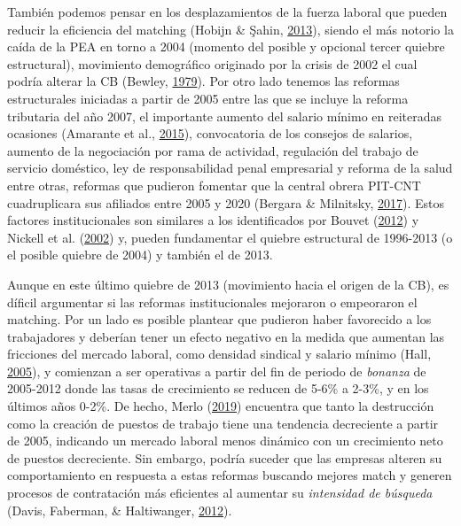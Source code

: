 \documentclass[12pt,oneside]{reedthesis}
\begin{document}
También podemos pensar en los desplazamientos de la fuerza laboral que pueden reducir la eficiencia del matching (Hobijn \& Şahin, \protect\hyperlink{ref-Hobijn2013}{2013}), siendo el más notorio la caída de la PEA en torno a 2004 (momento del posible y opcional tercer quiebre estructural), movimiento demográfico originado por la crisis de 2002 el cual podría alterar la CB (Bewley, \protect\hyperlink{ref-Bewley1979}{1979}). Por otro lado tenemos las reformas estructurales iniciadas a partir de 2005 entre las que se incluye la reforma tributaria del año 2007, el importante aumento del salario mínimo en reiteradas ocasiones (Amarante et al., \protect\hyperlink{ref-Amarante2015}{2015}), convocatoria de los consejos de salarios, aumento de la negociación por rama de actividad, regulación del trabajo de servicio doméstico, ley de responsabilidad penal empresarial y reforma de la salud entre otras, reformas que pudieron fomentar que la central obrera PIT-CNT cuadruplicara sus afiliados entre 2005 y 2020 (Bergara \& Milnitsky, \protect\hyperlink{ref-Bergara2017}{2017}). Estos factores institucionales son similares a los identificados por Bouvet (\protect\hyperlink{ref-Bouvet2012}{2012}) y Nickell et al. (\protect\hyperlink{ref-Nickell2002}{2002}) y, pueden fundamentar el quiebre estructural de 1996-2013 (o el posible quiebre de 2004) y también el de 2013.

Aunque en este último quiebre de 2013 (movimiento hacia el origen de la CB), es díficil argumentar si las reformas institucionales mejoraron o empeoraron el matching. Por un lado es posible plantear que pudieron haber favorecido a los trabajadores y deberían tener un efecto negativo en la medida que aumentan las fricciones del mercado laboral, como densidad sindical y salario mínimo (Hall, \protect\hyperlink{ref-Hall2005}{2005}), y comienzan a ser operativas a partir del fin de periodo de \emph{bonanza} de 2005-2012 donde las tasas de crecimiento se reducen de 5-6\% a 2-3\%, y en los últimos años 0-2\%. De hecho, Merlo (\protect\hyperlink{ref-Merlo2019}{2019}) encuentra que tanto la destrucción como la creación de puestos de trabajo tiene una tendencia decreciente a partir de 2005, indicando un mercado laboral menos dinámico con un crecimiento neto de puestos decreciente.
Sin embargo, podría suceder que las empresas alteren su comportamiento en respuesta a estas reformas buscando mejores match y generen procesos de contratación más eficientes al aumentar su \emph{intensidad de búsqueda} (Davis, Faberman, \& Haltiwanger, \protect\hyperlink{ref-Haltiwanger2012}{2012}).
\end{document}
